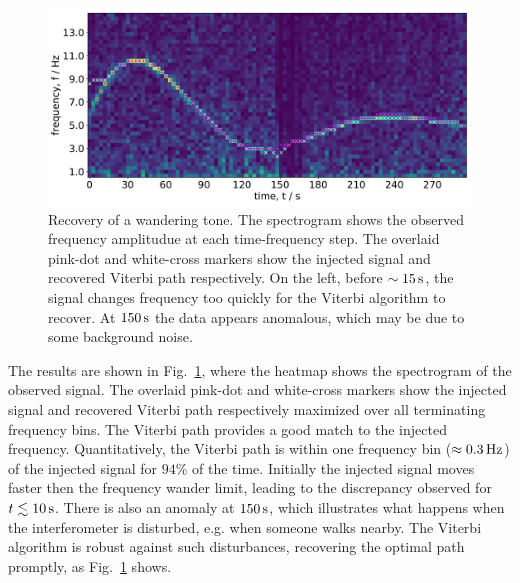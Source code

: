 \documentclass[paper-main.tex]{subfiles}
\begin{document}
\begin{figure}
	\includegraphics[width=\textwidth]{figures/expt_overlay_2_viterbi_test_webcam.pdf}
	\caption{\label{fig:viterbi_overlay}
Recovery of a wandering tone. 
The spectrogram shows the observed frequency amplitudue at each time-frequency step. 
The overlaid pink-dot and white-cross markers show the injected signal and recovered Viterbi path respectively. 
On the left, before $\sim 15\,{\rm s}$, the signal changes frequency too quickly for the Viterbi algorithm to recover. 
At $150\,{\rm s}$ the data appears anomalous, which may be due to some background noise. }
\end{figure}


The results are shown in Fig.~\ref{fig:viterbi_overlay}, where the heatmap shows the spectrogram of the observed signal. 
The overlaid pink-dot and white-cross markers show the injected signal and recovered Viterbi path respectively maximized over all terminating frequency bins. 
The Viterbi path provides a good match to the injected frequency. 
Quantitatively, the Viterbi path is within one frequency bin ($\approx 0.3\,{\rm Hz}$) of the injected signal for $94\%$ of the time. 
Initially the injected signal moves faster then the frequency wander limit, leading to the discrepancy observed for $t\lesssim 10\,{\rm s}$. 
There is also an anomaly at $150\,{\rm s}$, which illustrates what happens when the interferometer is disturbed, e.g. when someone walks nearby. 
The Viterbi algorithm is robust against such disturbances, recovering the optimal path promptly, as Fig.~\ref{fig:viterbi_overlay} shows. 
\end{document}
